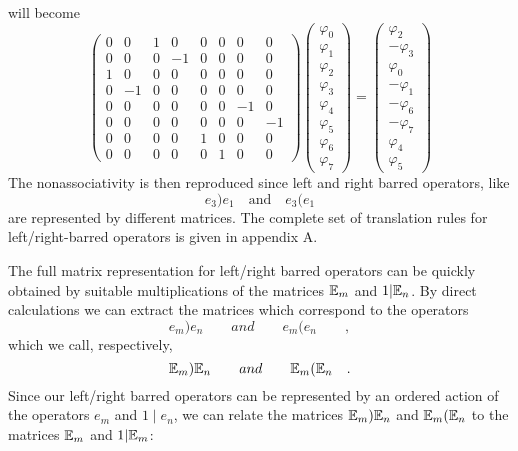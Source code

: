 \documentclass[a4paper,12pt]{book}
\begin{document}
will become 
\begin{equation}
\left( 
\begin{array}{llllllll}
0 & 0 & 1 & 0 & 0 & 0 & 0 & 0 \\ 
0 & 0 & 0 & -1 & 0 & 0 & 0 & 0 \\ 
1 & 0 & 0 & 0 & 0 & 0 & 0 & 0 \\ 
0 & -1 & 0 & 0 & 0 & 0 & 0 & 0 \\ 
0 & 0 & 0 & 0 & 0 & 0 & -1 & 0 \\ 
0 & 0 & 0 & 0 & 0 & 0 & 0 & -1 \\ 
0 & 0 & 0 & 0 & 1 & 0 & 0 & 0 \\ 
0 & 0 & 0 & 0 & 0 & 1 & 0 & 0
\end{array}
\right) \left( 
\begin{array}{l}
\varphi _{0} \\ 
\varphi _{1} \\ 
\varphi _{2} \\ 
\varphi _{3} \\ 
\varphi _{4} \\ 
\varphi _{5} \\ 
\varphi _{6} \\ 
\varphi _{7}
\end{array}
\right) =\left( 
\begin{array}{l}
\varphi _{2} \\ 
-\varphi _{3} \\ 
\varphi _{0} \\ 
-\varphi _{1} \\ 
-\varphi _{6} \\ 
-\varphi _{7} \\ 
\varphi _{4} \\ 
\varphi _{5}
\end{array}
\right)
\end{equation}
The nonassociativity is then reproduced since left and right barred
operators, like 
\[
e_{3}\mathbf{)}e_{1}\quad \mbox{and}\quad e_{3}\mathbf{(}e_{1} 
\]
are represented by different matrices. The complete set of translation rules
for left/right-barred operators is given in appendix A.

The full matrix representation for left/right barred operators can be
quickly obtained by suitable multiplications of the matrices $\Bbb{E}_{m}$
and $1|\Bbb{E}_{n}$. By direct calculations we can extract the matrices
which correspond to the operators 
\[
e_{m}\mathbf{)}e_{n}\quad \quad and\quad \quad e_{m}\mathbf{(}e_{n}\quad
\quad , 
\]
which we call, respectively, 
\[
\Bbb{E}_{m}\mathbf{)}\Bbb{E}_{n}\quad \quad and\quad \quad \Bbb{E}_{m}%
\mathbf{(}\Bbb{E}_{n}\quad . 
\]
Since our left/right barred operators can be represented by an ordered
action of the operators $e_{m}$ and $1\mid e_{n}$, we can relate the
matrices $\Bbb{E}_{m}\mathbf{)}\Bbb{E}_{n}$ and $\Bbb{E}_{m}\mathbf{(}\Bbb{E}%
_{n}$ to the matrices $\Bbb{E}_{m}$ and $1|\Bbb{E}_{m}$:
\end{document}

